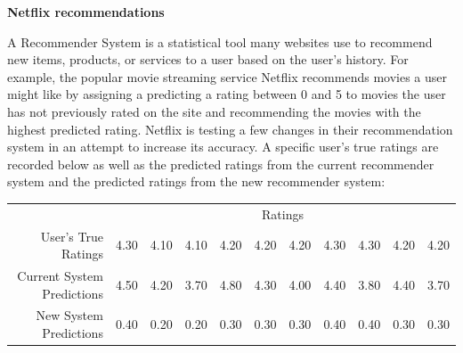 \documentclass[addpoints]{examsetup}\usepackage[]{graphicx}\usepackage[]{color}
\begin{document}



\examCoverPage

\begin{questions}

\question



\textbf{Netflix recommendations}

A Recommender System is a statistical tool many websites use to recommend new items, products, or services to a user based on the user's history.
For example, the popular movie streaming service Netflix recommends movies a user might like by assigning a predicting a rating between 0 and 5 to movies the user has not previously rated on the site and recommending the movies with the highest predicted rating.
Netflix is testing a few changes in their recommendation system in an attempt to increase its accuracy.
A specific user's true ratings are recorded below as well as the predicted ratings from the current recommender system and the predicted ratings from the new recommender system:


\begin{table}[ht]
\centering
\begin{tabular}{rrrrrrrrrrr}
   & \multicolumn{10}{c}{Ratings} \\
User's True Ratings & 4.30 & 4.10 & 4.10 & 4.20 & 4.20 & 4.20 & 4.30 & 4.30 & 4.20 & 4.20 \\ 
  Current System Predictions & 4.50 & 4.20 & 3.70 & 4.80 & 4.30 & 4.00 & 4.40 & 3.80 & 4.40 & 3.70 \\ 
  New System Predictions & 0.40 & 0.20 & 0.20 & 0.30 & 0.30 & 0.30 & 0.40 & 0.40 & 0.30 & 0.30 \\ 
  \end{tabular}
\end{table}



\end{questions}
\end{document}

